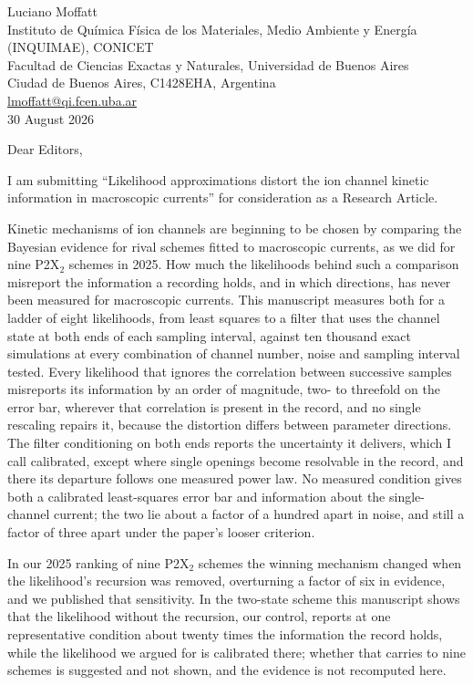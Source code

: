 \documentclass[10.5pt,a4paper]{article}
\begin{document}
\begin{flushright}
Luciano Moffatt\\
Instituto de Química Física de los Materiales, Medio Ambiente y Energía (INQUIMAE), CONICET\\
Facultad de Ciencias Exactas y Naturales, Universidad de Buenos Aires\\
Ciudad de Buenos Aires, C1428EHA, Argentina\\
\href{mailto:lmoffatt@qi.fcen.uba.ar}{lmoffatt@qi.fcen.uba.ar}\\[0.6em]
30 August 2026
\end{flushright}

Dear Editors,

I am submitting ``Likelihood approximations distort the ion channel kinetic information in
macroscopic currents'' for consideration as a Research Article.

Kinetic mechanisms of ion channels are beginning to be chosen by comparing the Bayesian evidence
for rival schemes fitted to macroscopic currents, as we did for nine P2X$_2$ schemes in 2025. How
much the likelihoods behind such a comparison misreport the information a recording holds, and in
which directions, has never been measured for macroscopic currents. This manuscript measures both
for a ladder of eight likelihoods, from least squares to a filter that uses the channel state at
both ends of each sampling interval, against ten thousand exact simulations at every combination
of channel number, noise and sampling interval tested.
Every likelihood that ignores the correlation between successive samples misreports its
information by an order of magnitude, two- to threefold on the error bar, wherever that correlation
is present in the record, and no single rescaling repairs it, because the distortion differs
between parameter directions. The filter conditioning on both ends reports the uncertainty it
delivers, which I call calibrated, except where single openings become resolvable in the record,
and there its departure follows one measured power law. No measured condition gives both a
calibrated least-squares error bar and information about the single-channel current; the two lie
about a factor of a hundred apart in noise, and still a factor of three apart under the paper's
looser criterion.

In our 2025 ranking of nine P2X$_2$ schemes the winning mechanism changed when the likelihood's
recursion was removed, overturning a factor of six in evidence, and we published that
sensitivity. In the two-state scheme this manuscript shows that the likelihood without the
recursion, our control, reports at one representative condition about twenty times the
information the record holds, while the likelihood we argued for is calibrated there; whether
that carries to nine schemes is suggested and not shown, and the evidence is not recomputed here.
\end{document}
